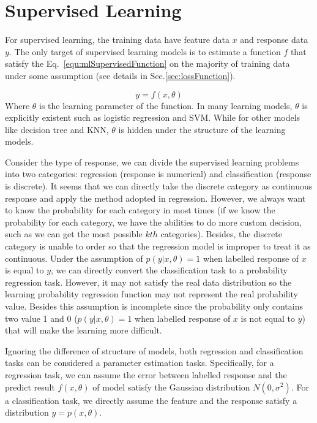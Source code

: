 \documentclass[runningheads,openany]{xhlPaper}
\begin{document}
\section{Supervised Learning}
For supervised learning, the training data have feature data $x$ and response data $y$.
The only target of supervised learning models is to estimate a function $f$ that satisfy the Eq.~\ref{equ:mlSupervisedFunction} on the majority of training data under some assumption (see details in Sec.\ref{sec:lossFunction}).

\begin{equation}
\label{equ:mlSupervisedFunction}
y = f\left( {x,\theta } \right)
\end{equation}
Where $\theta$ is the learning parameter of the function. In many learning models, $\theta$ is explicitly existent such as logistic regression and SVM. While for other models like decision tree and KNN, $\theta$ is hidden under the structure of the learning models.

Consider the type of response, we can divide the supervised learning problems into two categories: regression (response is numerical) and classification (response is discrete). 
It seems that we can directly take the discrete category as continuous response and apply the method adopted in regression. 
However, we always want to know the probability for each category in most times (if we know the probability for each category, we have the abilities to do more custom decision, such as we can get the most possible $kth$ categories). 
Besides, the discrete category is unable to order so that the regression model is improper to treat it as continuous.
Under the assumption of $p\left( {y|x,\theta } \right) = 1$ when labelled response of $x$ is equal to $y$, we can directly convert the classification task to a probability regression task.
However, it may not satisfy the real data distribution so the learning probability regression function may not represent the real probability value.
Besides this assumption is incomplete since the probability only contains two value 1 and 0 ($p\left( {y|x,\theta } \right) = 1$ when labelled response of $x$ is not equal to $y$) that will make the learning more difficult.

Ignoring the difference of structure of models, both regression and classification tasks can be considered a parameter estimation tasks.
Specifically, for a regression task, we can assume the error between labelled response and the predict result $f\left( {x,\theta } \right)$ of model satisfy the Gaussian distribution $N\left( {0,{\sigma ^2}} \right)$.
For a classification task, we directly assume the feature and the response satisfy a distribution $y = p\left( {x,\theta } \right)$.
\end{document}
